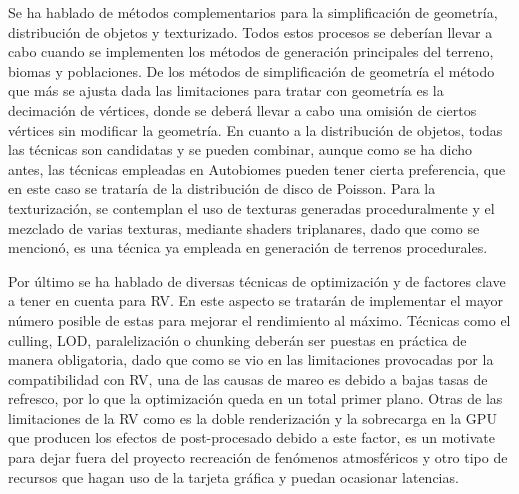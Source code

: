     Se ha hablado de métodos complementarios para la simplificación de geometría, distribución de objetos y texturizado. Todos estos procesos se deberían llevar a cabo cuando se implementen los métodos de generación principales del terreno, biomas y poblaciones. De los métodos de simplificación de geometría el método que más se ajusta dada las limitaciones para tratar con geometría es la decimación de vértices, donde se deberá llevar a cabo una omisión de ciertos vértices sin modificar la geometría. En cuanto a la distribución de objetos, todas las técnicas son candidatas y se pueden combinar, aunque como se ha dicho antes, las técnicas empleadas en Autobiomes pueden tener cierta preferencia, que en este caso se trataría de la distribución de disco de Poisson. Para la texturización, se contemplan el uso de texturas generadas proceduralmente y el mezclado de varias texturas, mediante shaders triplanares, dado que como se mencionó, es una técnica ya empleada en generación de terrenos procedurales.
    
    Por último se ha hablado de diversas técnicas de optimización y de factores clave a tener en cuenta para RV. En este aspecto se tratarán de implementar el mayor número posible de estas para mejorar el rendimiento al máximo. Técnicas como el culling, LOD, paralelización o chunking deberán ser puestas en práctica de manera obligatoria, dado que como se vio en las limitaciones provocadas por la compatibilidad con RV, una de las causas de mareo es debido a bajas tasas de refresco, por lo que la optimización queda en un total primer plano. Otras de las limitaciones de la RV como es la doble renderización y la sobrecarga en la GPU que producen los efectos de post-procesado debido a este factor, es un motivate para dejar fuera del proyecto recreación de fenómenos atmosféricos y otro tipo de recursos que hagan uso de la tarjeta gráfica y puedan ocasionar latencias. 

